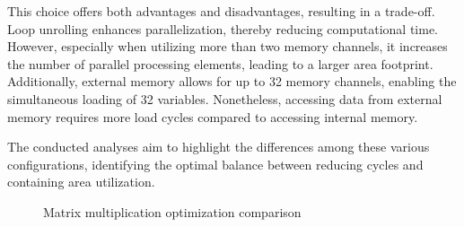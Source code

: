 This choice offers both advantages and disadvantages, resulting in a trade-off.
Loop unrolling enhances parallelization, thereby reducing computational time.
However, especially when utilizing more than two memory channels, it increases the number of parallel processing elements, leading to a larger area footprint.
Additionally, external memory allows for up to 32 memory channels, enabling the simultaneous loading of 32 variables.
Nonetheless, accessing data from external memory requires more load cycles compared to accessing internal memory.

The conducted analyses aim to highlight the differences among these various configurations, identifying the optimal balance between reducing cycles and containing area utilization.

\begin{figure}[t]
    \centering
    \hspace{0.15\textwidth}
    \caption{Matrix multiplication optimization comparison}
    \label{fig:matmul-optimization-comparison}
\end{figure}

